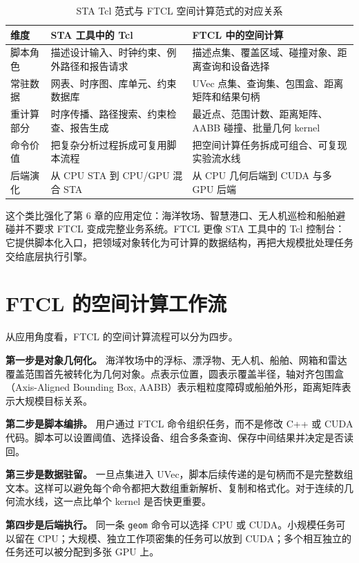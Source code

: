 \begin{table}[H]
\centering
\caption{STA Tcl 范式与 FTCL 空间计算范式的对应关系}
\label{tab:sta-ftcl-analogy}
\begin{tabularx}{\textwidth}{p{}XX}
\toprule
维度 & STA 工具中的 Tcl & FTCL 中的空间计算 \\
\midrule
脚本角色 & 描述设计输入、时钟约束、例外路径和报告请求 & 描述点集、覆盖区域、碰撞对象、距离查询和设备选择 \\
常驻数据 & 网表、时序图、库单元、约束数据库 & UVec 点集、查询集、包围盒、距离矩阵和结果句柄 \\
重计算部分 & 时序传播、路径搜索、约束检查、报告生成 & 最近点、范围计数、距离矩阵、AABB 碰撞、批量几何 kernel \\
命令价值 & 把复杂分析过程拆成可复用脚本流程 & 把空间计算任务拆成可组合、可复现实验流水线 \\
后端演化 & 从 CPU STA 到 CPU/GPU 混合 STA & 从 CPU 几何后端到 CUDA 与多 GPU 后端 \\
\bottomrule
\end{tabularx}
\end{table}

这个类比强化了第 6 章的应用定位：海洋牧场、智慧港口、无人机巡检和船舶避碰并不要求 FTCL 变成完整业务系统。FTCL 更像 STA 工具中的 Tcl 控制台：它提供脚本化入口，把领域对象转化为可计算的数据结构，再把大规模批处理任务交给底层执行引擎。

\section{FTCL 的空间计算工作流}
从应用角度看，FTCL 的空间计算流程可以分为四步。

\textbf{第一步是对象几何化。} 海洋牧场中的浮标、漂浮物、无人机、船舶、网箱和雷达覆盖范围首先被转化为几何对象。点表示位置，圆表示覆盖半径，轴对齐包围盒（Axis-Aligned Bounding Box, AABB）表示粗粒度障碍或船舶外形，距离矩阵表示大规模目标关系。

\textbf{第二步是脚本编排。} 用户通过 FTCL 命令组织任务，而不是修改 C++ 或 CUDA 代码。脚本可以设置阈值、选择设备、组合多条查询、保存中间结果并决定是否读回。

\textbf{第三步是数据驻留。} 一旦点集进入 UVec，脚本后续传递的是句柄而不是完整数组文本。这样可以避免每个命令都把大数组重新解析、复制和格式化。对于连续的几何流水线，这一点比单个 kernel 是否快更重要。

\textbf{第四步是后端执行。} 同一条 \texttt{geom} 命令可以选择 CPU 或 CUDA。小规模任务可以留在 CPU；大规模、独立工作项密集的任务可以放到 CUDA；多个相互独立的任务还可以被分配到多张 GPU 上。

